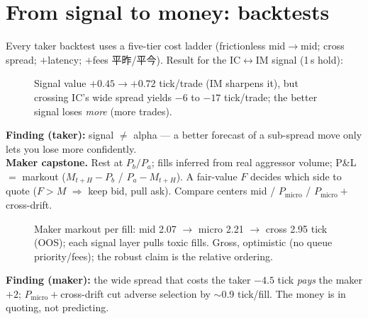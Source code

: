 \documentclass[11pt]{article}
\begin{document}
\section{From signal to money: backtests}
Every taker backtest uses a five-tier cost ladder (frictionless mid$\to$mid; cross spread;
$+$latency; $+$fees 平昨/平今). Result for the IC$\leftrightarrow$IM signal (1\,s hold):
\begin{figure}[H]\centering
  \caption{Signal value $+0.45\to+0.72$ tick/trade (IM sharpens it), but crossing IC's wide
  spread yields $-6$ to $-17$ tick/trade; the better signal loses \emph{more} (more trades).}
  \label{fig:taker}
\end{figure}
\textbf{Finding (taker):} signal $\ne$ alpha --- a better forecast of a sub-spread move only
lets you lose more confidently.
\\[4pt]
\textbf{Maker capstone.} Rest at $P_b/P_a$; fills inferred from real aggressor volume; P\&L $=$
markout ($M_{t+H}-P_b$ / $P_a-M_{t+H}$). A fair-value $F$ decides which side to quote
($F>M$ $\Rightarrow$ keep bid, pull ask). Compare centers mid / $P_{\text{micro}}$ /
$P_{\text{micro}}+$cross-drift.
\begin{figure}[H]\centering
  \caption{Maker markout per fill: mid 2.07 $\to$ micro 2.21 $\to$ cross 2.95 tick (OOS);
  each signal layer pulls toxic fills. Gross, optimistic (no queue priority/fees); the robust
  claim is the relative ordering.}
  \label{fig:maker}
\end{figure}
\textbf{Finding (maker):} the wide spread that costs the taker $-4.5$ tick \emph{pays} the maker
$+2$; $P_{\text{micro}}+$cross-drift cut adverse selection by $\sim$0.9 tick/fill. The money is
in quoting, not predicting.
\end{document}
